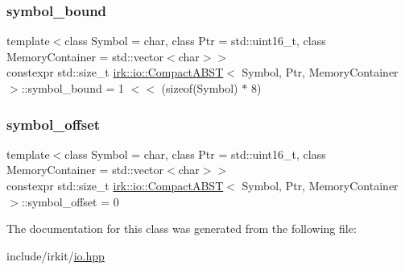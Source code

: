 \mbox{\label{classirk_1_1io_1_1CompactABST_abdb9153cd0b7ebd701fbdd12c5a6b1e0}} 
\subsubsection{\texorpdfstring{symbol\+\_\+bound}{symbol\_bound}}
{\footnotesize\ttfamily template$<$class Symbol = char, class Ptr = std\+::uint16\+\_\+t, class Memory\+Container = std\+::vector$<$char$>$$>$ \\
constexpr std\+::size\+\_\+t \mbox{\hyperlink{classirk_1_1io_1_1CompactABST}{irk\+::io\+::\+Compact\+A\+B\+ST}}$<$ Symbol, Ptr, Memory\+Container $>$\+::symbol\+\_\+bound = 1 $<$$<$ (sizeof(Symbol) $\ast$ 8)\hspace{0.3cm}{\ttfamily [static]}}

\mbox{\label{classirk_1_1io_1_1CompactABST_a98a8a4bc4fe63cfcf02f636abc208096}} 
\subsubsection{\texorpdfstring{symbol\+\_\+offset}{symbol\_offset}}
{\footnotesize\ttfamily template$<$class Symbol = char, class Ptr = std\+::uint16\+\_\+t, class Memory\+Container = std\+::vector$<$char$>$$>$ \\
constexpr std\+::size\+\_\+t \mbox{\hyperlink{classirk_1_1io_1_1CompactABST}{irk\+::io\+::\+Compact\+A\+B\+ST}}$<$ Symbol, Ptr, Memory\+Container $>$\+::symbol\+\_\+offset = 0\hspace{0.3cm}{\ttfamily [static]}}



The documentation for this class was generated from the following file\+:\begin{DoxyCompactItemize}
\item 
include/irkit/\mbox{\hyperlink{io_8hpp}{io.\+hpp}}\end{DoxyCompactItemize}
